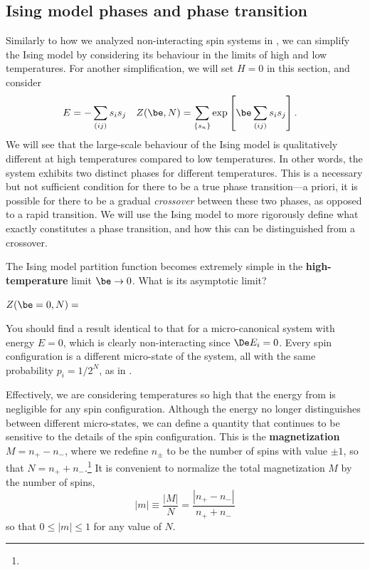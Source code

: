 \subsection{\label{sec:Ising_phases}Ising model phases and phase transition}
Similarly to how we analyzed non-interacting spin systems in , we can simplify the Ising model by considering its behaviour in the limits of high and low temperatures.
For another simplification, we will set $H = 0$ in this section, and consider
\begin{align}
  \label{eq:Ising_zero_field}
  E & = -\sum_{(ij)} s_i s_j &
  Z(\be, N) & = \sum_{\left\{s_n\right\}} \exp\left[\be\sum_{(ij)} s_i s_j\right].
\end{align}
We will see that the large-scale behaviour of the Ising model is qualitatively different at high temperatures compared to low temperatures.
In other words, the system exhibits two distinct phases for different temperatures.
This is a necessary but not sufficient condition for there to be a true phase transition---a priori, it is possible for there to be a gradual \textit{crossover} between these two phases, as opposed to a rapid transition.
We will use the Ising model to more rigorously define what exactly constitutes a phase transition, and how this can be distinguished from a crossover.

\newpage %
The Ising model partition function becomes extremely simple in the \textbf{high-temperature} limit $\be \to 0$.
What is its asymptotic limit?
\begin{mdframed}
  $\displaystyle Z(\be = 0, N) = $ \\[50 pt]
\end{mdframed}
You should find a result identical to that for a micro-canonical system with energy $E = 0$, which is clearly non-interacting since $\De E_i = 0$.
Every spin configuration is a different micro-state of the system, all with the same probability $p_i = 1 / 2^N$, as in .

Effectively, we are considering temperatures so high that the energy from  is negligible for any spin configuration.
Although the energy no longer distinguishes between different micro-states, we can define a quantity that continues to be sensitive to the details of the spin configuration.
This is the \textbf{magnetization} $M = n_+ - n_-$, where we redefine $n_{\pm}$ to be the number of spins with value $\pm 1$, so that $N = n_+ + n_-$.\footnote{}
It is convenient to normalize the total magnetization $M$ by the number of spins,
\begin{equation}
  \label{eq:Ising_magnet}
  |m| \equiv \frac{|M|}{N} = \frac{|n_+ - n_-|}{n_+ + n_-}
\end{equation}
so that $0 \leq |m| \leq 1$ for any value of $N$.

